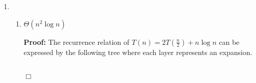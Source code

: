 \documentclass[11pt]{article}
\def\endproofmark{$\Box$}
\newenvironment{proof}{\par{\bf Proof:}}{\endproofmark\smallskip}
\begin{document}
\begin{enumerate}[label=(\alph*)]
\begin{enumerate}[label=(\roman*)]
\item
$\Theta(\log{n})$
\begin{proof}
The recurrence relation of $T(n) = 2T(\sqrt{n}) + 5$, and $T(2) = 5$ can be expressed by the following tree where each layer represents an expansion. \\
 \\
There are $\log{\log{n}}$ layers in this tree. \\
By analyzing this tree, I noticed that the $k^{th}$ layer sums to $2^k * 5^{\frac{1} {2^k}}$ and each layer has a greater sum than the one above it. This means that the last layer dominates the layers above it and we can analyze this relation by finding the sum of the last row. To get the sum of the last row, I assigned $k = \log{\log{n}}$ and so the layer sums to $2^{\log{\log{n}}} * 5^{\frac{1} {2^{\log{\log{n}}}}} = \log{n} * 5^{\frac{1} {\log{n}}} \in \Theta(\log{n})$. \\
\end{proof}
\end{enumerate}
\item
\begin{enumerate}[label=(\roman*)]
\item
$\Theta(n^2\log{n})$
\begin{proof}
The recurrence relation of $T(n) = 2T(\frac{n} {2}) + n\log{n}$ can be expressed by the following tree where each layer represents an expansion. \\
 \\

\end{proof}
\end{enumerate}
\end{enumerate}
\end{document}

